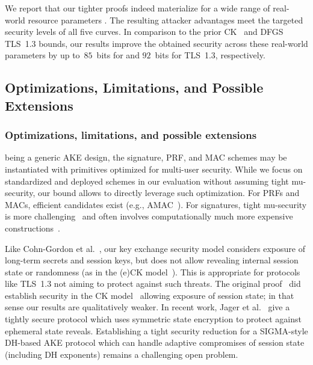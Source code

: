 \fi
We report that our tighter proofs indeed materialize for a wide range of real-world resource parameters%
.
The resulting attacker advantages meet the targeted security levels of all five curves.
In comparison to the prior CK~\cite{C:CanKra02} \SIGMA and DFGS~\cite{JC:DFGS21} TLS~1.3 bounds,
our results improve the obtained security across these real-world parameters by up to~$85$~bits for \SIGMA and $92$~bits for TLS~1.3, respectively.


\iffull

\iffull
\subsection{Optimizations, Limitations, and Possible Extensions}
\else
\subsubsection*{Optimizations, limitations, and possible extensions\lncsdot}
\fi
\SIGMA being a generic AKE design, the signature, PRF, and MAC schemes may be instantiated with primitives optimized for multi-user security.
While we focus on standardized and deployed schemes in our evaluation without assuming tight mu-security, our \SIGMA bound allows to directly leverage such optimization.
For PRFs and MACs,  efficient candidates exist (e.g., AMAC~\cite{EC:BelBerTes16}).
For signatures, tight mu-security is more challenging~\cite{EC:BJLS16} and often involves computationally much more expensive constructions~\cite{TCC:BHJKL15}.

Like Cohn-Gordon et al.~\cite{C:CCGJJ19}, our key exchange security model considers exposure of long-term secrets and session keys,
but does not allow revealing internal session state or randomness (as in the (e)CK model~\cite{EC:CanKra01,PROVSEC:LaMLauMit07}).
This is appropriate for protocols like TLS~1.3 not aiming to protect against such threats.
The original \SIGMA proof~\cite{C:CanKra02} did establish security in the CK model~\cite{EC:CanKra01} allowing exposure of session state;
in that sense our results are qualitatively weaker.
In recent work, Jager et al.~\cite{EC:JKRS21} give a tightly secure protocol which uses symmetric state encryption to protect against ephemeral state reveals.
Establishing a tight security reduction for a SIGMA-style DH-based AKE protocol which can handle adaptive compromises of session state (including DH exponents) remains a challenging open problem.

